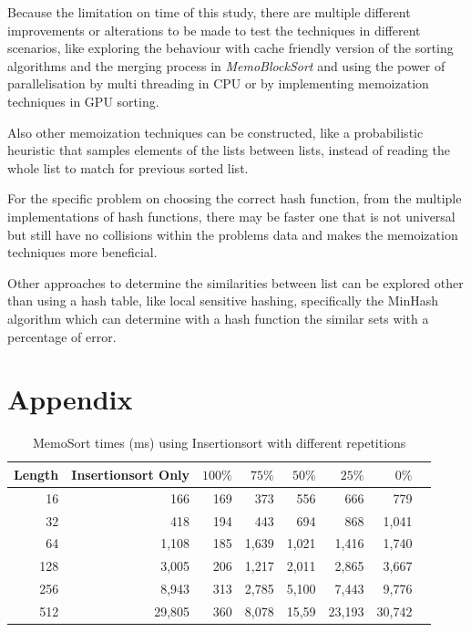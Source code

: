 \documentclass[a4paper,12pt]{article}
\begin{document}
Because the limitation on time of this study, there are multiple different improvements or alterations to be made to test the techniques in different scenarios, like exploring the behaviour with cache friendly version of the sorting algorithms and the merging process in {\it MemoBlockSort} and using the power of parallelisation by multi threading in CPU or by implementing memoization techniques in GPU sorting.

Also other memoization techniques can be constructed, like a probabilistic heuristic that samples elements of the lists between lists, instead of reading the whole list to match for previous sorted list.

For the specific problem on choosing the correct hash function, from the multiple implementations of hash functions, there may be faster one that is not universal but still have no collisions within the problems data and makes the memoization techniques more beneficial.

Other approaches to determine the similarities between list can be explored other than using a hash table, like local sensitive hashing, specifically the MinHash algorithm which can determine with a hash function the similar sets with a percentage of error.






\section{Appendix}

\begin{table}[H]
\centering
\begin{tabular}{|r|r|r|r|r|r|r|r|}   \hline
	{Length} & {Insertionsort Only} & {$100\%$} & {$75\%$} & {$50\%$} & {$25\%$} & {$0\%$} \\  \hline
	16 &166 &169&373& 556& 666& 779\\ 
	32 &418 &194&443& 694& 868& 1,041\\ 
	64 &1,108&185 &1,639&1,021&1,416 & 1,740\\ 
	128 &3,005 &206&1,217&2,011&2,865 &3,667\\ 
	256 &8,943 &313&2,785&5,100&7,443&9,776\\ 
	512 &29,805& 360&8,078&15,59 &23,193 &30,742\\  \hline
\end{tabular}
\caption{MemoSort times (ms) using Insertionsort with different repetitions}
\end{table}
\end{document}
